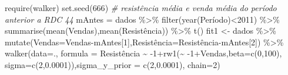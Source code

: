 \documentclass[
]{book}
\newenvironment{Shaded}{\begin{snugshade}}{\end{snugshade}}
\newcommand{\AttributeTok}[1]{\textcolor[rgb]{0.77,0.63,0.00}{#1}}
\newcommand{\CommentTok}[1]{\textcolor[rgb]{0.56,0.35,0.01}{\textit{#1}}}
\newcommand{\DecValTok}[1]{\textcolor[rgb]{0.00,0.00,0.81}{#1}}
\newcommand{\FloatTok}[1]{\textcolor[rgb]{0.00,0.00,0.81}{#1}}
\newcommand{\FunctionTok}[1]{\textcolor[rgb]{0.00,0.00,0.00}{#1}}
\newcommand{\NormalTok}[1]{#1}
\newcommand{\OtherTok}[1]{\textcolor[rgb]{0.56,0.35,0.01}{#1}}
\newcommand{\SpecialCharTok}[1]{\textcolor[rgb]{0.00,0.00,0.00}{#1}}
\begin{document}
\begin{Shaded}
\begin{Highlighting}[]
\FunctionTok{require}\NormalTok{(walker)}
\FunctionTok{set.seed}\NormalTok{(}\DecValTok{666}\NormalTok{)}
\CommentTok{\# resistência média e venda média do período anterior a RDC 44}
\NormalTok{mAntes }\OtherTok{=}\NormalTok{ dados }\SpecialCharTok{\%\textgreater{}\%} \FunctionTok{filter}\NormalTok{(}\FunctionTok{year}\NormalTok{(Período)}\SpecialCharTok{\textless{}}\DecValTok{2011}\NormalTok{) }\SpecialCharTok{\%\textgreater{}\%} 
        \FunctionTok{summarise}\NormalTok{(}\FunctionTok{mean}\NormalTok{(Vendas),}\FunctionTok{mean}\NormalTok{(Resistência)) }\SpecialCharTok{\%\textgreater{}\%} \FunctionTok{t}\NormalTok{()}
\NormalTok{fit1 }\OtherTok{\textless{}{-}}\NormalTok{ dados }\SpecialCharTok{\%\textgreater{}\%} 
  \FunctionTok{mutate}\NormalTok{(}\AttributeTok{Vendas=}\NormalTok{Vendas}\SpecialCharTok{{-}}\NormalTok{mAntes[}\DecValTok{1}\NormalTok{],Resistência}\OtherTok{=}\NormalTok{Resistência}\SpecialCharTok{{-}}\NormalTok{mAntes[}\DecValTok{2}\NormalTok{]) }\SpecialCharTok{\%\textgreater{}\%}
  \FunctionTok{walker}\NormalTok{(}\AttributeTok{data=}\NormalTok{., }\AttributeTok{formula =}\NormalTok{ Resistência }\SpecialCharTok{\textasciitilde{}} \SpecialCharTok{{-}}\DecValTok{1}\SpecialCharTok{+}\FunctionTok{rw1}\NormalTok{(}\SpecialCharTok{\textasciitilde{}} \SpecialCharTok{{-}}\DecValTok{1}\SpecialCharTok{+}\NormalTok{Vendas,}\AttributeTok{beta=}\FunctionTok{c}\NormalTok{(}\DecValTok{0}\NormalTok{,}\DecValTok{100}\NormalTok{),}
    \AttributeTok{sigma=}\FunctionTok{c}\NormalTok{(}\DecValTok{2}\NormalTok{,}\FloatTok{0.0001}\NormalTok{)),}\AttributeTok{sigma\_y\_prior =} \FunctionTok{c}\NormalTok{(}\DecValTok{2}\NormalTok{,}\FloatTok{0.0001}\NormalTok{), }\AttributeTok{chain=}\DecValTok{2}\NormalTok{)}
\end{Highlighting}
\end{Shaded}
\end{document}
